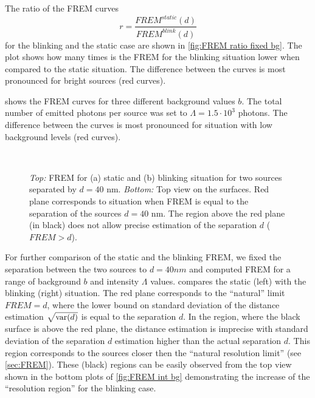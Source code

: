 The ratio of the FREM curves
%
\begin{equation}
	r=\frac{\unit{FREM}^{static}(d)}{\unit{FREM}^{blink}(d)}
	\label{eq:ratio}
\end{equation} 
%
for the blinking and the static case are shown in \autoref{fig:FREM ratio fixed bg}. The plot shows how many times is the FREM for the blinking situation lower when compared to the static situation. The difference between the curves is most pronounced for bright sources (red curves). 

 shows the FREM curves for three different background values $b$. The total number of emitted photons per source was set to $\Lambda =1.5\cdot 10^3$ photons. The difference between the curves is most pronounced for situation with low background levels (red curves). 

\clearpage
\begin{figure}[!b]
	\centering
	\newcommand{\wf}{.48\textwidth}
	\\
	\caption{{\it Top:} FREM for (a) static and (b) blinking situation for two sources separated by $d=40$ nm. {\it Bottom:} Top view on the surfaces. Red plane corresponds to situation when FREM is equal to the separation of the sources $d=40$ nm. The region above the red plane (in black) does not allow precise estimation of the separation $d$ ($\unit{FREM}>d$).}
	\label{fig:FREM int bg}
\end{figure}
%
For further comparison of the static and the blinking FREM, we fixed the separation between the two sources to $d=40\unit{nm}$ and computed FREM for a range of background $b$ and intensity  $\Lambda$ values.  compares the static (left) with the blinking (right) situation. The red plane corresponds to the ``natural'' limit $\unit{FREM}=d$, where the lower bound on standard deviation of the distance estimation $\sqrt{\mathrm{var}(d)}$ is equal to the separation $d$. In the region, where the black surface is above the red plane, the distance estimation is imprecise with standard deviation of the separation $d$ estimation higher than the actual separation $d$. This region corresponds to the sources closer then the ``natural resolution limit'' (see \autoref{sec:FREM}).  These (black) regions can be easily observed from the top view shown in the bottom plots of \autoref{fig:FREM int bg} demonstrating the increase of the ``resolution region'' for the blinking case.

